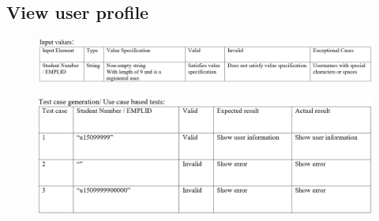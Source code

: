 \documentclass[english]{article}
\begin{document}
\subsection{View user profile}
\begin{figure}[ht!]
\hspace*{-2.5cm} 
\includegraphics[width=180mm]{8.png}
\end{figure}
\begin{figure}[ht!]
\hspace*{-2.5cm} 
\includegraphics[width=180mm]{ViewTestCase.png}
\end{figure}
\end{document}
